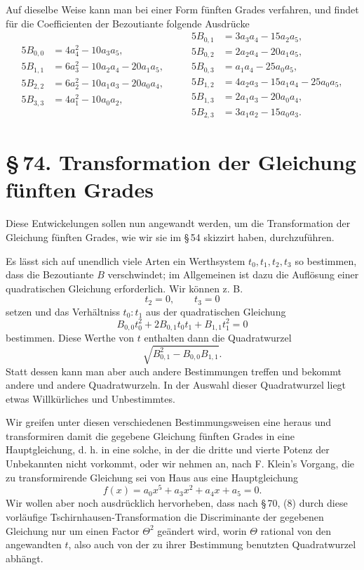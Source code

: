 \documentclass[11pt]{article}
\providecommand{\sect}[2]{\section*{\S\,#1. #2}}
\begin{document}
Auf dieselbe Weise kann man bei einer Form fünften Grades verfahren, und findet für die Coefficienten der Bezoutiante folgende Ausdrücke
\[
\begin{aligned}
5B_{0,0}&=4a_4^2-10a_3a_5,\\
5B_{1,1}&=6a_3^2-10a_2a_4-20a_1a_5,\\
5B_{2,2}&=6a_2^2-10a_1a_3-20a_0a_4,\\
5B_{3,3}&=4a_1^2-10a_0a_2,
\end{aligned}\qquad
\begin{aligned}
5B_{0,1}&=3a_3a_4-15a_2a_5,\\
5B_{0,2}&=2a_2a_4-20a_1a_5,\\
5B_{0,3}&=a_1a_4-25a_0a_5,\\
5B_{1,2}&=4a_2a_3-15a_1a_4-25a_0a_5,\\
5B_{1,3}&=2a_1a_3-20a_0a_4,\\
5B_{2,3}&=3a_1a_2-15a_0a_3.
\end{aligned}
\]

\sect{74}{Transformation der Gleichung fünften Grades}

Diese Entwickelungen sollen nun angewandt werden, um die Transformation der Gleichung fünften Grades, wie wir sie im \S\,54 skizzirt haben, durchzuführen.

Es lässt sich auf unendlich viele Arten ein Werthsystem $t_0,t_1,t_2,t_3$ so bestimmen, dass die Bezoutiante $B$ verschwindet; im Allgemeinen ist dazu die Auflösung einer quadratischen Gleichung erforderlich. Wir können z. B.
\[
 t_2=0,\qquad t_3=0
\]
setzen und das Verhältniss $t_0:t_1$ aus der quadratischen Gleichung
\[
 B_{0,0}t_0^2+2B_{0,1}t_0t_1+B_{1,1}t_1^2=0
\]
bestimmen. Diese Werthe von $t$ enthalten dann die Quadratwurzel
\[
 \sqrt{B_{0,1}^2-B_{0,0}B_{1,1}}.
\]
Statt dessen kann man aber auch andere Bestimmungen treffen und bekommt andere und andere Quadratwurzeln. In der Auswahl dieser Quadratwurzel liegt etwas Willkürliches und Unbestimmtes.

Wir greifen unter diesen verschiedenen Bestimmungsweisen eine heraus und transformiren damit die gegebene Gleichung fünften Grades in eine Hauptgleichung, d. h. in eine solche, in der die dritte und vierte Potenz der Unbekannten nicht vorkommt, oder wir nehmen an, nach F. Klein's Vorgang, die zu transformirende Gleichung sei von Haus aus eine Hauptgleichung
\begin{equation}
 f(x)=a_0x^5+a_3x^2+a_4x+a_5=0.
\tag{1}
\end{equation}
Wir wollen aber noch ausdrücklich hervorheben, dass nach \S\,70, (8) durch diese vorläufige Tschirnhausen-Transformation die Discriminante der gegebenen Gleichung nur um einen Factor $\Theta^2$ geändert wird, worin $\Theta$ rational von den angewandten $t$, also auch von der zu ihrer Bestimmung benutzten Quadratwurzel abhängt.
\end{document}
